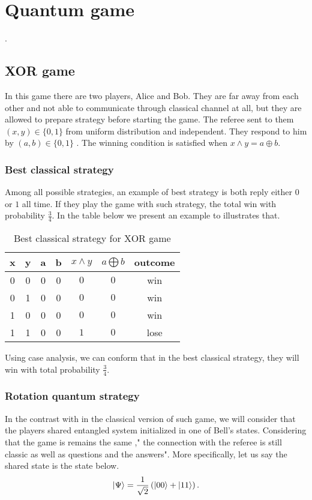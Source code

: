 \chapter{Quantum game}\hfill \break.
\section{XOR game}\hfill \break
In this game there are  two players, Alice and Bob. They are far away from each other and not able to communicate through classical channel at all, but they are allowed to prepare strategy  before starting the game. The referee sent to them    $(x,y)\in \{0,1\}$  from uniform distribution and independent\citep*{PhysRevA.93.022333}. They respond  to him by $(a,b)\in \{0,1\}$ .  The   winning  condition is satisfied when $x\wedge y= a\oplus b$.
\subsection{Best classical strategy}\hfill \break
Among all possible strategies, an example of best strategy is both reply either $0$ or $1$ all time. If they play the game with such strategy, the total win with probability $\frac{3}{4}$.
In the table below we present an example to illustrates that.

\begin {table}[htp]
\begin{center}
\begin{tabular}{ |c|c|c|c|c |c|c| }
  \hline
  x & y & a & b &  $x \wedge y $ & $a\bigoplus b$& outcome\\
  \hline 
  0 & 0 & 0 & 0&$0$  & $0$& win\\
  \hline
  0 &1 & 0 & 0 &$0$  & $0$&win\\
  \hline
   1 & 0 & 0 & 0 &$0$ &  $0$& win\\
  \hline
  1 & 1 & 0 & 0 &$1$  & $0$& lose\\
  \hline
\end{tabular}
\caption {Best classical strategy for XOR game }
\end{center}
\end{table}
Using case analysis, we can conform that in the best classical strategy, they will win with total probability $\frac{3}{4}$.
\subsection{Rotation quantum strategy}\hfill \break

In the contrast with in the classical version of such game, we will consider that the players shared entangled system initialized in one of Bell's states. Considering that the game is remains the same ," the connection with the referee is still classic as well as questions and the answers". More specifically, let us say the shared state is the state below.
\begin{equation}
\ket{\Psi }= \frac{1}{\sqrt{2}}\left( \ket{00} +\ket{11} \right)\label{eq1} .
\end{equation}
	  
